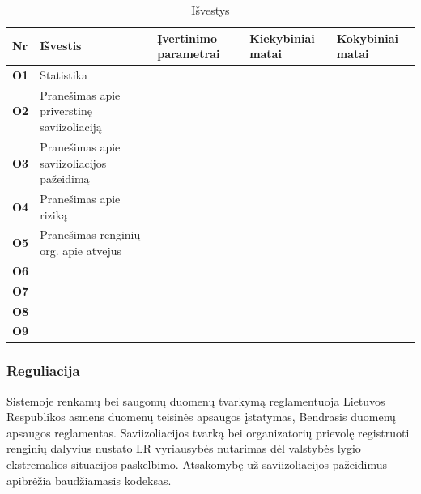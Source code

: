 \documentclass{VUMIFPSkursinis}
\begin{document}
\begin{center}
\begin{longtable}{|L{0.5cm}|L{4cm}|L{3cm}|L{3cm}|L{3cm}|}

\caption{Išvestys}
\label{table:output} \\ \hline
			
			\textbf{Nr} & \textbf{Išvestis}                          & Įvertinimo parametrai & Kiekybiniai matai & Kokybiniai matai \\ \hline
			\textbf{O1} & Statistika                             &                       &                   &                  \\ \hline
			\textbf{O2} & Pranešimas apie priverstinę saviizoliaciją &                       &                   &                  \\ \hline
			\textbf{O3} & Pranešimas apie saviizoliacijos pažeidimą  &                       &                   &                  \\ \hline
			\textbf{O4} & Pranešimas apie riziką                     &                       &                   &                  \\ \hline
			\textbf{O5} & Pranešimas renginių org. apie atvejus      &                       &                   &                  \\ \hline
			\textbf{O6} &                                            &                       &                   &                  \\ \hline
			\textbf{O7} &                                            &                       &                   &                  \\ \hline
			\textbf{O8} &                                            &                       &                   &                  \\ \hline
			\textbf{O9} &                                            &                       &                   &                  \\ \hline
\end{longtable}
\end{center}

\subsubsection{Reguliacija}
Sistemoje renkamų bei saugomų duomenų tvarkymą reglamentuoja Lietuvos Respublikos asmens duomenų teisinės apsaugos įstatymas,
Bendrasis duomenų apsaugos reglamentas. Saviizoliacijos tvarką bei organizatorių prievolę registruoti renginių dalyvius nustato
LR vyriausybės nutarimas dėl valstybės lygio ekstremalios situacijos paskelbimo. Atsakomybę už saviizoliacijos pažeidimus
apibrėžia baudžiamasis kodeksas.
\end{document}
